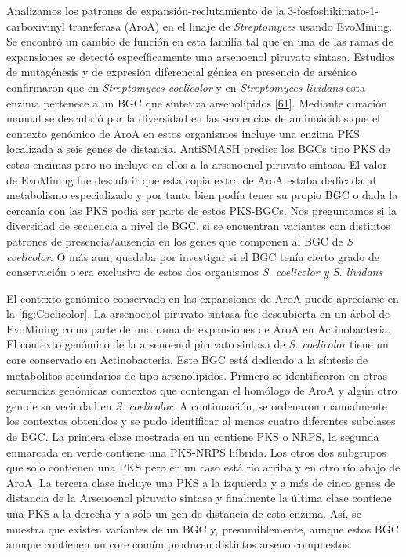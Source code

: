 \documentclass[12pt,twoside]{reedthesis}
\begin{document}
  Analizamos los patrones de expansión-reclutamiento de la
  3-fosfoshikimato-1-carboxivinyl transferasa (AroA) en el linaje de
  \emph{Streptomyces} usando EvoMining. Se encontró un cambio de función
  en esta familia tal que en una de las ramas de expansiones se detectó
  específicamente una arsenoenol piruvato sintasa. Estudios de mutagénesis
  y de expresión diferencial génica en presencia de arsénico confirmaron
  que en \emph{Streptomyces coelicolor} y en \emph{Streptomyces lividans}
  esta enzima pertenece a un BGC que sintetiza arsenolípidos
  {[}\protect\hyperlink{ref-cruz-morales_phylogenomic_2016}{61}{]}.
  Mediante curación manual se descubrió por la diversidad en las
  secuencias de aminoácidos que el contexto genómico de AroA en estos
  organismos incluye una enzima PKS localizada a seis genes de distancia.
  AntiSMASH predice los BGCs tipo PKS de estas enzimas pero no incluye en
  ellos a la arsenoenol piruvato sintasa. El valor de EvoMining fue
  descubrir que esta copia extra de AroA estaba dedicada al metabolismo
  especializado y por tanto bien podía tener su propio BGC o dada la
  cercanía con las PKS podía ser parte de estos PKS-BGCs. Nos preguntamos
  si la diversidad de secuencia a nivel de BGC, si se encuentran variantes
  con distintos patrones de presencia/ausencia en los genes que componen
  al BGC de \emph{S coelicolor}. O más aun, quedaba por investigar si el
  BGC tenía cierto grado de conservación o era exclusivo de estos dos
  organismos \emph{S. coelicolor y S. lividans}
  
  El contexto genómico conservado en las expansiones de AroA puede
  apreciarse en la \autoref{fig:Coelicolor}. La arsenoenol piruvato
  sintasa fue descubierta en un árbol de EvoMining como parte de una rama
  de expansiones de AroA en Actinobacteria. El contexto genómico de la
  arsenoenol piruvato sintasa de \emph{S. coelicolor } tiene un core
  conservado en Actinobacteria. Este BGC está dedicado a la síntesis de
  metabolitos secundarios de tipo arsenolípidos. Primero se identificaron
  en otras secuencias genómicas contextos que contengan el homólogo de
  AroA y algún otro gen de su vecindad en \emph{S. coelicolor}. A
  continuación, se ordenaron manualmente los contextos obtenidos y se pudo
  identificar al menos cuatro diferentes subclases de BGC. La primera
  clase mostrada en un contiene PKS o NRPS, la segunda enmarcada en verde
  contiene una PKS-NRPS híbrida. Los otros dos subgrupos que solo
  contienen una PKS pero en un caso está río arriba y en otro río abajo de
  AroA. La tercera clase incluye una PKS a la izquierda y a más de cinco
  genes de distancia de la Arsenoenol piruvato sintasa y finalmente la
  última clase contiene una PKS a la derecha y a sólo un gen de distancia
  de esta enzima. Así, se muestra que existen variantes de un BGC y,
  presumiblemente, aunque estos BGC aunque contienen un core común
  producen distintos arseno compuestos.
  
\end{document}
